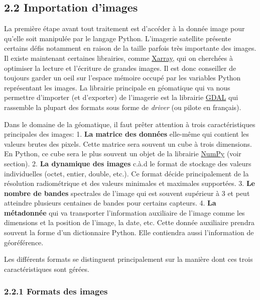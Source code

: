 \documentclass[
]{article}
\begin{document}
\subsection{\texorpdfstring{{2.2} Importation
d'images}{2.2 Importation d'images}}\label{importation-dimages}

La première étape avant tout traitement est d'accéder à la donnée image
pour qu'elle soit manipulée par le langage Python. L'imagerie satellite
présente certains défis notamment en raison de la taille parfois très
importante des images. Il existe maintenant certaines librairies, comme
\href{https://docs.xarray.dev/en/stable/}{Xarray}, qui on cherchées à
optimiser la lecture et l'écriture de grandes images. Il est donc
conseiller de toujours garder un oeil sur l'espace mémoire occupé par
les variables Python représentant les images. La librairie principale en
géomatique qui va nous permettre d'importer (et d'exporter) de
l'imagerie est la librairie \href{https://gdal.org}{GDAL} qui rassemble
la plupart des formats sous forme de \emph{driver} (ou pilote en
français).

Dans le domaine de la géomatique, il faut prêter attention à trois
caractéristiques principales des images: 1. \textbf{La matrice des
données} elle-même qui contient les valeurs brutes des pixels. Cette
matrice sera souvent un cube à trois dimensions. En Python, ce cube sera
le plus souvent un objet de la librairie
\href{https://numpy.org/}{NumPy} (voir section). 2. \textbf{La dynamique
des images} c.à.d le format de stockage des valeurs individuelles
(octet, entier, double, etc.). Ce format décide principalement de la
résolution radiométrique et des valeurs minimales et maximales
supportées. 3. \textbf{Le nombre de bandes} spectrales de l'image qui
est souvent supérieur à 3 et peut atteindre plusieurs centaines de
bandes pour certains capteurs. 4. \textbf{La métadonnée} qui va
transporter l'information auxiliaire de l'image comme les dimensions et
la position de l'image, la date, etc. Cette donnée auxiliaire prendra
souvent la forme d'un dictionnaire Python. Elle contiendra aussi
l'information de géoréférence.

Les différents formats se distinguent principalement sur la manière dont
ces trois caractéristiques sont gérées.

\subsubsection{\texorpdfstring{{2.2.1} Formats des
images}{2.2.1 Formats des images}}\label{formats-des-images}
\end{document}
